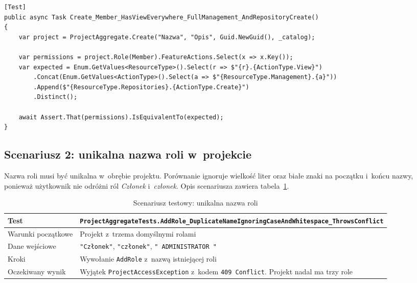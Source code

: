 \begin{lstlisting}[basicstyle=\footnotesize\ttfamily, captionpos=t, caption={Test uprawnień domyślnej roli \textit{Członek}}, label={lst:ut-role}]
[Test]
public async Task Create_Member_HasViewEverywhere_FullManagement_AndRepositoryCreate()
{
    var project = ProjectAggregate.Create("Nazwa", "Opis", Guid.NewGuid(), _catalog);

    var permissions = project.Role(Member).FeatureActions.Select(x => x.Key());
    var expected = Enum.GetValues<ResourceType>().Select(r => $"{r}.{ActionType.View}")
        .Concat(Enum.GetValues<ActionType>().Select(a => $"{ResourceType.Management}.{a}"))
        .Append($"{ResourceType.Repositories}.{ActionType.Create}")
        .Distinct();

    await Assert.That(permissions).IsEquivalentTo(expected);
}
\end{lstlisting}

\subsection{Scenariusz 2: unikalna nazwa roli w~projekcie}
Nazwa roli musi być unikalna w~obrębie projektu. Porównanie ignoruje wielkość liter oraz białe znaki na początku i~końcu
nazwy, ponieważ użytkownik nie odróżni ról \textit{Członek} i~\textit{członek}. Opis scenariusza zawiera tabela~\ref{tab:ut-nazwa-roli}.

\begin{table}[htb]
    \centering
    \caption{Scenariusz testowy: unikalna nazwa roli}
    \label{tab:ut-nazwa-roli}
    \small
    \begin{tabularx}{\linewidth}{@{}>{\raggedright\arraybackslash}p{3.5cm} >{\raggedright\arraybackslash}X@{}}
        \hline
        Test & \texttt{ProjectAggregateTests.\allowbreak{}AddRole\_\allowbreak{}DuplicateNameIgnoringCaseAndWhitespace\_\allowbreak{}ThrowsConflict} \\ \hline
        Warunki początkowe & Projekt z~trzema domyślnymi rolami \\ \hline
        Dane wejściowe & \texttt{"Członek"}, \texttt{"członek"}, \texttt{"  ADMINISTRATOR  "} \\ \hline
        Kroki & Wywołanie \texttt{AddRole} z~nazwą istniejącej roli \\ \hline
        Oczekiwany wynik & Wyjątek \texttt{ProjectAccessException} z~kodem \texttt{409 Conflict}. Projekt nadal ma trzy role \\ \hline
    \end{tabularx}
\end{table}

